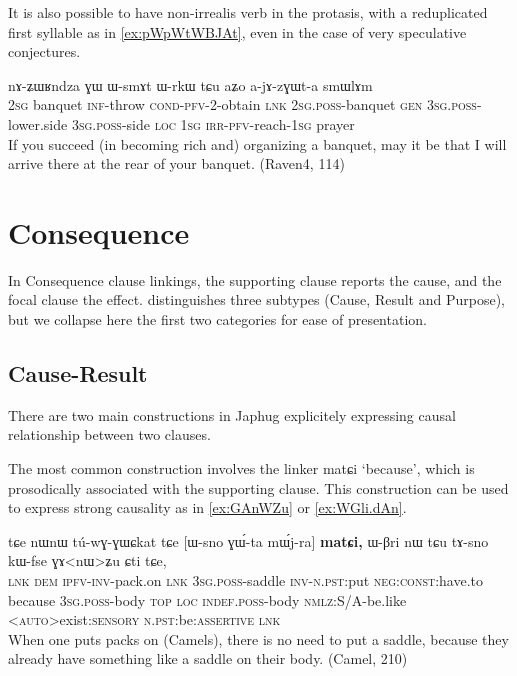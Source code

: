 \documentclass[oldfontcommands,oneside,a4paper,11pt]{article}
\newcommand{\ipa}[1]{{\phon \mbox{#1}}} %
\begin{document}
 
 It is also possible to have non-irrealis verb in the protasis, with a reduplicated first syllable as in \ref{ex:pWpWtWBJAt}, even in the case of very speculative conjectures.
\begin{exe}
\ex \label{ex:pWpWtWBJAt}
\gll 
[\ipa{nɤʑo}  	\ipa{ʑɯʁndza}  	\ipa{kɤ-lɤt}  	\textbf{\ipa{pɯ-pɯ-tɯ-βɟɤt}}]  	\ipa{nɤ,}  	\ipa{nɤ-ʑɯʁndza}  	\ipa{ɣɯ}  	\ipa{ɯ-smɤt}  	\ipa{ɯ-rkɯ}  	\ipa{tɕu}  	\ipa{aʑo}  	\ipa{a-jɤ-zɣɯt-a}  	\ipa{smɯlɤm}  \\
\textsc{2sg} banquet \textsc{inf}-throw \textsc{cond-pfv}-2-obtain \textsc{lnk} \textsc{2sg.poss}-banquet \textsc{gen} \textsc{3sg.poss}-lower.side \textsc{3sg.poss}-side \textsc{loc} \textsc{1sg} \textsc{irr-pfv}-reach-\textsc{1sg} prayer \\
\glt  If you succeed (in becoming rich and) organizing a banquet, may it be that I will arrive there at the rear of your banquet. (Raven4, 114)
\end{exe} 


\section{Consequence}
In Consequence clause linkings, the supporting clause   reports the cause, and the focal clause the effect. \citet[17, 44]{dixon09intro} distinguishes three subtypes (Cause, Result and Purpose), but we collapse here the first two categories for ease  of presentation.

    


\subsection{Cause-Result} \label{sec:cause}
There are two main constructions in Japhug explicitely expressing causal relationship between two clauses. 

The most common construction involves the linker \ipa{matɕi} `because', which is prosodically associated with the supporting clause.  This construction can be used to express strong causality as in \ref{ex:GAnWZu} or \ref{ex:WGli.dAn}.
\begin{exe}
\ex \label{ex:GAnWZu}
\gll 
\ipa{tɕe}   	\ipa{nɯnɯ}   	\ipa{tú-wɣ-ɣɯɕkat}   	\ipa{tɕe}   	[\ipa{ɯ-sno}   	\ipa{ɣɯ́-ta}   	\ipa{mɯ́j-ra}]   	\textbf{\ipa{matɕi,}}   	\ipa{ɯ-βri}   	\ipa{nɯ} \ipa{tɕu}   	\ipa{tɤ-sno}   	\ipa{kɯ-fse}   	\ipa{ɣɤ<nɯ>ʑu}   	\ipa{ɕti}   	\ipa{tɕe,}   \\
\textsc{lnk} \textsc{dem} \textsc{ipfv-inv}-pack.on \textsc{lnk} \textsc{3sg.poss}-saddle \textsc{inv-n.pst}:put \textsc{neg:const}:have.to because   \textsc{3sg.poss}-body \textsc{top} \textsc{loc} \textsc{indef.poss}-body \textsc{nmlz}:S/A-be.like <\textsc{auto}>exist:\textsc{sensory} \textsc{n.pst:}be:\textsc{assertive} \textsc{lnk} \\
\glt When one puts packs on (Camels), there is no need to put a saddle, because they already have something like a saddle on their body. (Camel, 210)
 \end{exe}
 
\end{document}
